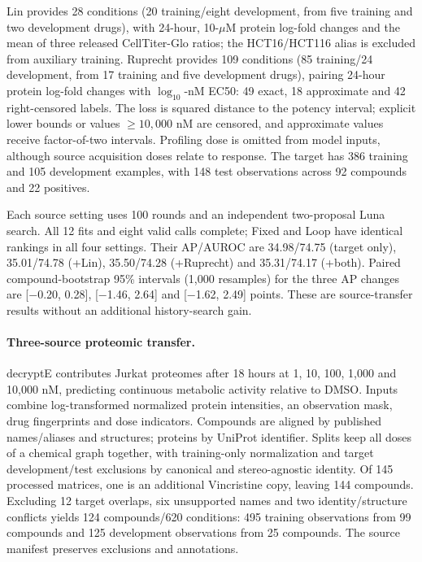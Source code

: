 Lin provides 28 conditions (20 training/eight development, from five training and two development drugs), with 24-hour, 10-$\mu$M protein log-fold changes and the mean of three released CellTiter-Glo ratios; the HCT16/HCT116 alias is excluded from auxiliary training. Ruprecht provides 109 conditions (85 training/24 development, from 17 training and five development drugs), pairing 24-hour protein log-fold changes with $\log_{10}$-nM EC50: 49 exact, 18 approximate and 42 right-censored labels. The loss is squared distance to the potency interval; explicit lower bounds or values $\geq10{,}000$ nM are censored, and approximate values receive factor-of-two intervals. Profiling dose is omitted from model inputs, although source acquisition doses relate to response. The target has 386 training and 105 development examples, with 148 test observations across 92 compounds and 22 positives.

Each source setting uses 100 rounds and an independent two-proposal Luna search. All 12 fits and eight valid calls complete; Fixed and Loop have identical rankings in all four settings. Their AP/AUROC are 34.98/74.75 (target only), 35.01/74.78 (+Lin), 35.50/74.28 (+Ruprecht) and 35.31/74.17 (+both). Paired compound-bootstrap 95\% intervals (1,000 resamples) for the three AP changes are [$-$0.20, 0.28], [$-$1.46, 2.64] and [$-$1.62, 2.49] points. These are source-transfer results without an additional history-search gain.

\paragraph{Three-source proteomic transfer.}
decryptE \citep{Eckert2024DecryptE} contributes Jurkat proteomes after 18 hours at 1, 10, 100, 1,000 and 10,000 nM, predicting continuous metabolic activity relative to DMSO. Inputs combine log-transformed normalized protein intensities, an observation mask, drug fingerprints and dose indicators. Compounds are aligned by published names/aliases and structures; proteins by UniProt identifier. Splits keep all doses of a chemical graph together, with training-only normalization and target development/test exclusions by canonical and stereo-agnostic identity. Of 145 processed matrices, one is an additional Vincristine copy, leaving 144 compounds. Excluding 12 target overlaps, six unsupported names and two identity/structure conflicts yields 124 compounds/620 conditions: 495 training observations from 99 compounds and 125 development observations from 25 compounds. The source manifest preserves exclusions and annotations.

